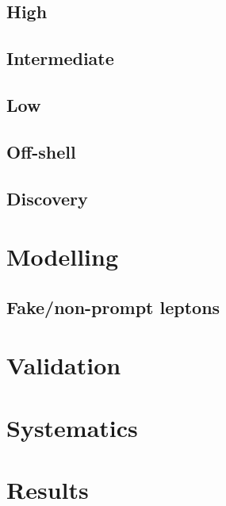 \subsection{High}

\subsection{Intermediate}

\subsection{Low}

\subsection{Off-shell}

\subsection{Discovery}

\section{Modelling}

\subsection{Fake/non-prompt leptons}

\section{Validation}

\section{Systematics}

\section{Results}


